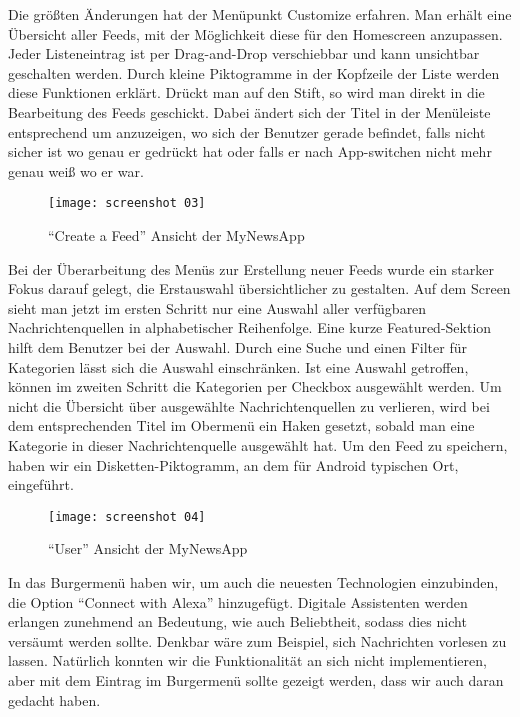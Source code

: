 Die größten Änderungen hat der Menüpunkt Customize erfahren. Man erhält eine Übersicht aller Feeds, mit der Möglichkeit diese für den Homescreen anzupassen. Jeder Listeneintrag ist per Drag-and-Drop verschiebbar und kann unsichtbar geschalten werden. Durch kleine Piktogramme in der Kopfzeile der Liste werden diese Funktionen erklärt. Drückt man auf den Stift, so wird man direkt in die Bearbeitung des Feeds geschickt. Dabei ändert sich der Titel in der Menüleiste entsprechend um anzuzeigen, wo sich der Benutzer gerade befindet, falls nicht sicher ist wo genau er gedrückt hat oder falls er nach App-switchen nicht mehr genau weiß wo er war.

\clearpage

\begin{wrapfigure}{R}{0.45\textwidth}
  \centering
  \texttt{[image: screenshot 03]}
  \caption{\enquote{Create a Feed} Ansicht der MyNewsApp}
  \label{fig:screenshot-03}
\end{wrapfigure}

Bei der Überarbeitung des Menüs zur Erstellung neuer Feeds wurde ein starker Fokus darauf gelegt, die Erstauswahl übersichtlicher zu gestalten. Auf dem Screen sieht man jetzt im ersten Schritt nur eine Auswahl aller verfügbaren Nachrichtenquellen in alphabetischer Reihenfolge. Eine kurze Featured-Sektion hilft dem Benutzer bei der Auswahl. Durch eine Suche und einen Filter für Kategorien lässt sich die Auswahl einschränken. Ist eine Auswahl getroffen, können im zweiten Schritt die Kategorien per Checkbox ausgewählt werden. Um nicht die Übersicht über ausgewählte Nachrichtenquellen zu verlieren, wird bei dem entsprechenden Titel im Obermenü ein Haken gesetzt, sobald man eine Kategorie in dieser Nachrichtenquelle ausgewählt hat. Um den Feed zu speichern, haben wir ein Disketten-Piktogramm, an dem für Android typischen Ort, eingeführt.

\clearpage

\begin{wrapfigure}{L}{0.45\textwidth}
  \centering
  \texttt{[image: screenshot 04]}
  \caption{\enquote{User} Ansicht der MyNewsApp}
  \label{fig:screenshot-04}
\end{wrapfigure}

In das Burgermenü haben wir, um auch die neuesten Technologien einzubinden, die Option \enquote{Connect with Alexa} hinzugefügt. Digitale Assistenten werden erlangen zunehmend an Bedeutung, wie auch Beliebtheit, sodass dies nicht versäumt werden sollte. Denkbar wäre zum Beispiel, sich Nachrichten vorlesen zu lassen. Natürlich konnten wir die Funktionalität an sich nicht implementieren, aber mit dem Eintrag im Burgermenü sollte gezeigt werden, dass wir auch daran gedacht haben.

